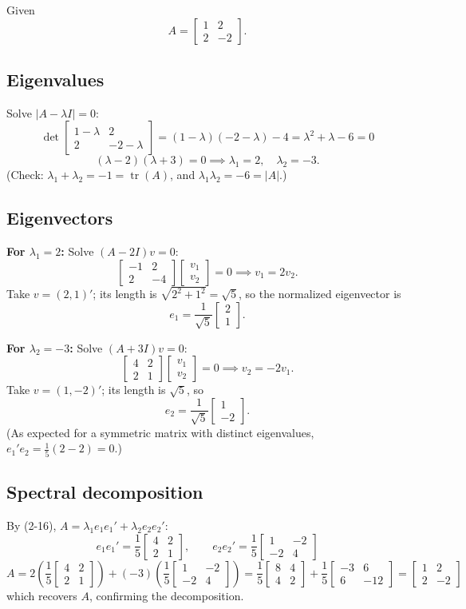 \documentclass[11pt]{article}
\newcommand{\mat}[1]{\begin{bmatrix} #1 \end{bmatrix}}
\begin{document}
Given
\[
A = \mat{1 & 2 \\ 2 & -2}.
\]

\subsection*{Eigenvalues}
Solve $|A - \lambda I| = 0$:
\[
\det\mat{1-\lambda & 2 \\ 2 & -2-\lambda} = (1-\lambda)(-2-\lambda) - 4 = \lambda^2 + \lambda - 6 = 0
\]
\[
(\lambda - 2)(\lambda+3) = 0 \implies \lambda_1 = 2, \quad \lambda_2 = -3.
\]
(Check: $\lambda_1+\lambda_2 = -1 = \operatorname{tr}(A)$, and $\lambda_1\lambda_2 = -6 = |A|$.)

\subsection*{Eigenvectors}
\textbf{For $\lambda_1 = 2$:} Solve $(A - 2I)v = 0$:
\[
\mat{-1 & 2 \\ 2 & -4}\mat{v_1\\v_2} = 0 \implies v_1 = 2v_2.
\]
Take $v = (2,1)'$; its length is $\sqrt{2^2+1^2} = \sqrt5$, so the normalized eigenvector is
\[
e_1 = \frac{1}{\sqrt5}\mat{2\\1}.
\]

\textbf{For $\lambda_2 = -3$:} Solve $(A+3I)v=0$:
\[
\mat{4 & 2 \\ 2 & 1}\mat{v_1\\v_2}=0 \implies v_2 = -2v_1.
\]
Take $v=(1,-2)'$; its length is $\sqrt5$, so
\[
e_2 = \frac{1}{\sqrt5}\mat{1\\-2}.
\]
(As expected for a symmetric matrix with distinct eigenvalues, $e_1'e_2 = \tfrac{1}{5}(2-2)=0$.)

\subsection*{Spectral decomposition}
By (2-16), $A = \lambda_1 e_1e_1' + \lambda_2 e_2e_2'$:
\[
e_1e_1' = \frac15\mat{4 & 2\\2 & 1}, \qquad e_2e_2' = \frac15\mat{1 & -2\\-2 & 4}
\]
\[
A = 2\left(\frac15\mat{4&2\\2&1}\right) + (-3)\left(\frac15\mat{1&-2\\-2&4}\right)
= \frac15\mat{8&4\\4&2} + \frac15\mat{-3&6\\6&-12}
= \mat{1 & 2\\ 2 & -2}
\]
which recovers $A$, confirming the decomposition.
\end{document}
